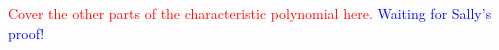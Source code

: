 \documentclass[12pt]{article}
\begin{document}

\textcolor{red}{Cover the other parts of the characteristic polynomial here.}
\textcolor{blue}{Waiting for Sally's proof!}
\end{document}
